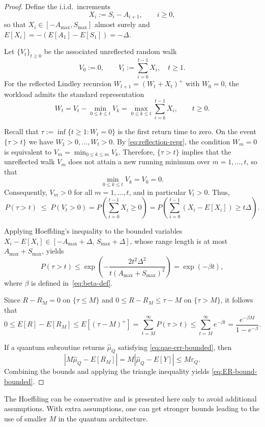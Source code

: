 \documentclass[11pt]{article}
\begin{document}
\begin{proof}
Define the i.i.d.\ increments
\[
X_i := S_i - A_{i+1},\qquad i\ge 0,
\]
so that $X_i\in[-A_{\max},S_{\max}]$ almost surely and
$E[X_i]=-(E[A_1]-E[S_1])=-\Delta$.

Let $\{V_t\}_{t\ge 0}$ be the associated unreflected random walk
\[
V_0 := 0,
\qquad
V_t := \sum_{i=0}^{t-1} X_i , \quad t\ge 1.
\]
For the reflected Lindley recursion $W_{t+1}=(W_t+X_t)^+$ with $W_0=0$, the
workload admits the standard representation
\begin{equation}
\label{eq:reflection-repr}
W_t = V_t - \min_{0\le k\le t} V_k
= \max_{0\le k\le t} \sum_{i=k}^{t-1} X_i ,
\qquad t\ge 0.
\end{equation}

Recall that $\tau:=\inf\{t\ge 1 : W_t=0\}$ is the first return time to zero.
On the event $\{\tau>t\}$ we have $W_1>0,\dots,W_t>0$.  By
\eqref{eq:reflection-repr}, the condition $W_m=0$ is equivalent to
$V_m=\min_{0\le k\le m}V_k$.  Therefore, $\{\tau>t\}$ implies that the
unreflected walk $V_m$ does not attain a new running minimum over
$m=1,\dots,t$, so that
\[
\min_{0\le k\le t} V_k = V_0 = 0.
\]
Consequently, $V_m>0$ for all $m=1,\dots,t$, and in particular $V_t>0$.
Thus,
\[
P(\tau>t)
\;\le\;
P(V_t>0)
=
P\!\left(\sum_{i=0}^{t-1} X_i \ge 0\right)
=
P\!\left(\sum_{i=0}^{t-1} (X_i-E[X_i]) \ge t\Delta\right).
\]

Applying Hoeffding's inequality to the bounded variables
$X_i-E[X_i]\in[-A_{\max}+\Delta,\,S_{\max}+\Delta]$, whose range length is at
most $A_{\max}+S_{\max}$, yields
\[
P(\tau>t)
\le
\exp\!\left(
-\frac{2t^2\Delta^2}{t(A_{\max}+S_{\max})^2}
\right)
=
\exp(-\beta t),
\]
where $\beta$ is defined in~\eqref{eq:beta-def}.

Since $R-R_M=0$ on $\{\tau\le M\}$ and $0\le R-R_M\le \tau-M$ on $\{\tau>M\}$,
it follows that
\[
0\le E[R]-E[R_M]
\le E[(\tau-M)^+]
= \sum_{t=M}^{\infty} P(\tau>t)
\le \sum_{t=M}^{\infty} e^{-\beta t}
= \frac{e^{-\beta M}}{1-e^{-\beta}}.
\]

If a quantum subroutine returns $\hat{\mu}_Q$ satisfying
\eqref{eq:qae-err-bounded}, then
\[
|M\hat{\mu}_Q - E[R_M]|
= M|\hat{\mu}_Q - E[Y]|
\le M\varepsilon_Q.
\]
Combining the bounds and applying the triangle inequality yields
\eqref{eq:ER-bound-bounded}.
\end{proof}
The Hoeffding can be conservative and is presented here only to avoid additional assumptions. With extra assumptions, one can get stronger bounds leading to the use of smaller $M$ in the quantum architecture.
\end{document}
